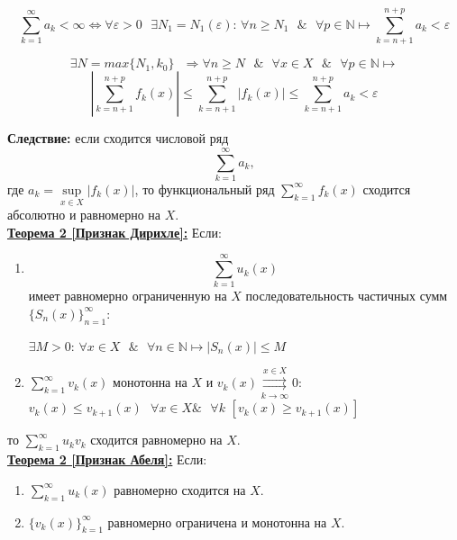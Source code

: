 \documentclass[a4paper,12pt]{article} %
\renewcommand {\geq}{\geqslant}
\renewcommand {\leq}{\leqslant}
\begin{document}
$$\sum\limits_{k = 1}^{\infty}a_k < \infty \Leftrightarrow \forall \varepsilon > 0 \text{ }\exists N_1 = N_1(\varepsilon)\text{: } \forall n \geq N_1 \text{ }\&\text{ } \forall p \in \mathds{N} \longmapsto \sum\limits_{k = n+1}^{n+p}a_k < \varepsilon$$ 

$$\exists N = max\{N_1, k_0\} \text{ } \Rightarrow \forall n \geq N \text{ } \& \text{ } \forall x \in X \text{ } \& \text{ } \forall p \in \mathds{N}\longmapsto$$ $$|\sum\limits_{k = n+1}^{n+p}f_k(x)| \leq \sum\limits_{k = n+1}^{n+p}|f_k(x)| \leq \sum\limits_{k = n+1}^{n+p}a_k < \varepsilon$$

\textbf{Следствие:} если сходится числовой ряд $$\sum\limits_{k = 1}^{\infty}a_k,$$ где $a_k = \sup\limits_{x \in X}|f_k(x)|$, то функциональный ряд $\sum\limits_{k = 1}^{\infty}  f_k(x)$ сходится абсолютно и равномерно на $X$. \\

\underline{\textbf{Теорема 2 [Признак Дирихле]:}} Если:
\begin{enumerate}
    \item $$\sum\limits_{k = 1}^{\infty}  u_k(x)$$ имеет равномерно ограниченную на $X$ последовательность частичных сумм $\{S_n(x)\}_{n=1}^\infty$: 
    \newline
    
    $\exists M > 0 \text{: } \forall x \in X \text{ }\& \text{ } \forall n \in \mathds{N} \longmapsto |S_n(x)| \leq M$
    
    \item $\sum\limits_{k = 1}^{\infty}  v_k(x)$ монотонна на $X$ и $v_k(x) \overset{x \in X}{\underset{k \rightarrow \infty}{\rightrightarrows}} 0$: \newline
    \\[5 mm]
    $v_k(x) \leq v_{k+1}(x) \text{ } \forall x \in X \text{} \& \text{ } \forall k$
    \newline
    $[v_k(x) \geq v_{k+1}(x)]$
    
\end{enumerate}

\hspace*{40 mm}то $\sum\limits_{k=1}^{\infty} u_k v_k$ сходится равномерно на $X$.\\

\underline{\textbf{Теорема 2 [Признак Абеля]:}}
Если:
\begin{enumerate}
    \item  $\sum\limits_{k=1}^\infty u_k(x)$ равномерно сходится на $X$.
    
    \item ${\{v_k(x)\}_{k=1}^\infty}$ равномерно ограничена и монотонна на $X$.
\end{enumerate}
\end{document}
